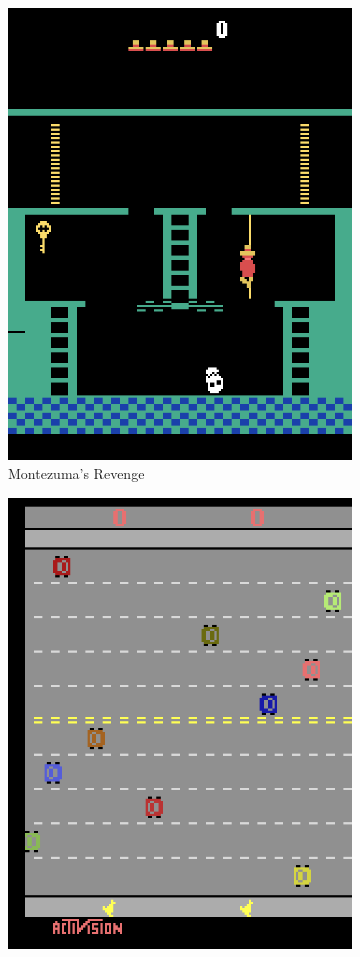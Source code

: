 \documentclass[draft,final]{vutinfth} %
\begin{document}
    \begin{figure}[h]
        \begin{center}
            \begin{subfigure}{.3\textwidth}
                \centering
                \includegraphics[width=.8\linewidth]{figures/montezumarevenge.png}
                \caption{Montezuma's Revenge}
                \label{fig:mz}
            \end{subfigure}%
            \begin{subfigure}{.3\textwidth}
                \centering
                \includegraphics[width=.8\linewidth]{figures/freeway.png}

\end{subfigure}
\end{center}
\end{figure}
\end{document}
